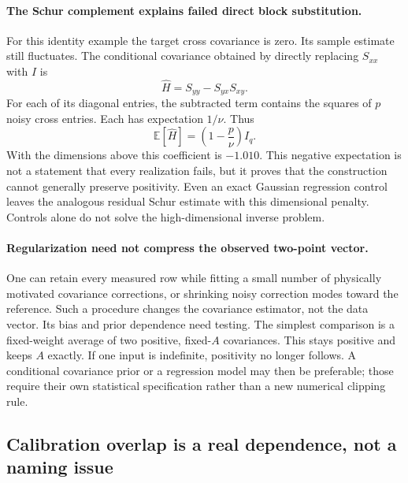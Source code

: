 \documentclass[11pt]{article}
\newcommand{\E}{\mathbb{E}}
\begin{document}
\paragraph{The Schur complement explains failed direct block substitution.}
For this identity example the target cross covariance is zero. Its sample
estimate still fluctuates. The conditional covariance obtained by directly
replacing $S_{xx}$ with $I$ is
\begin{equation}
 \widehat H=S_{yy}-S_{yx}S_{xy}.
\end{equation}
For each of its diagonal entries, the subtracted term contains the squares
of $p$ noisy cross entries. Each has expectation $1/\nu$. Thus
\begin{equation}
 \E[\widehat H]=\left(1-\frac{p}{\nu}\right)I_q.
\end{equation}
With the dimensions above this coefficient is $-1.010$. This negative
expectation is not a statement that every realization fails, but it proves
that the construction cannot generally preserve positivity. Even an exact
Gaussian regression control leaves the analogous residual Schur estimate
with this dimensional penalty. Controls alone do not solve the
high-dimensional inverse problem.

\paragraph{Regularization need not compress the observed two-point vector.}
One can retain every measured row while fitting a small number of physically
motivated covariance corrections, or shrinking noisy correction modes toward
the reference. Such a procedure changes the covariance estimator, not the
data vector. Its bias and prior dependence need testing. The simplest
comparison is a fixed-weight average of two positive, fixed-$A$
covariances. This stays positive and keeps $A$ exactly. If one input is
indefinite, positivity no longer follows. A conditional covariance prior
or a regression model may then be preferable; those require their own
statistical specification rather than a new numerical clipping rule.

\subsection{Calibration overlap is a real dependence, not a naming issue}
\end{document}
